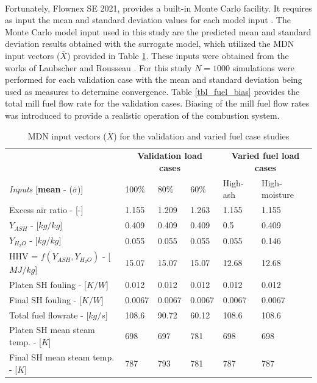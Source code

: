\documentclass[a4paper,fleqn]{cas-sc}
\begin{document}
Fortunately, Flownex SE\textsuperscript{\textregistered} 2021, provides a built-in Monte Carlo facility. It requires as input the mean and standard deviation values for each model input \cite{flownex}. The Monte Carlo model input used in this study are the predicted mean and standard deviation results obtained with the surrogate model, which utilized the MDN input vectors ($\overline{X}$) provided in Table \ref{tbl_inputs}. These inputs were obtained from the works of Laubscher and Rousseau \cite{Laubscher2019b}. For this study $N=1000$ simulations were performed for each validation case with the mean and standard deviation being used as measures to determine convergence. Table \ref{tbl_fuel_bias} provides the total mill fuel flow rate for the validation cases. Biasing of the mill fuel flow rates was introduced to provide a realistic operation of the combustion system.\\

\begin{table}[h!]
\caption{MDN input vectors ($\overline{X}$) for the validation and varied fuel case studies}\label{tbl_inputs}
\begin{tabular*}{\tblwidth}{lp{}p{}p{}p{}p{}}
\toprule
 & \multicolumn{3}{c}{\textbf{Validation load cases}}&\multicolumn{2}{c}{\textbf{Varied fuel load cases}}\\
\textit{Inputs} [\textbf{mean} - ($\overline{\sigma}$)]& 100\%  & 80\% & 60\% & High-ash & High-moisture  \\
\midrule
Excess air ratio - [-] & 1.155 & 1.209 & 1.263 & 1.155 & 1.155  \\
$Y_{ASH}$ - [$kg/kg$] & 0.409 & 0.409 &  0.409 &0.5 & 0.409 \\
$Y_{H_{2}O}$ - [$kg/kg$] & 0.055 & 0.055 & 0.055 & 0.055 & 0.146  \\
HHV = $f(Y_{ASH},Y_{H_{2}O})$ - [$MJ/kg$] & 15.07 & 15.07 & 15.07 & 12.68 & 12.68  \\
Platen SH fouling - [$K/W$]& 0.012 & 0.012 & 0.012 & 0.012 & 0.012  \\
Final SH fouling - [$K/W$] & 0.0067&0.0067 &0.0067 & 0.0067&0.0067  \\
Total fuel flowrate - [$kg/s$] &108.6 & 90.72 & 60.12 &108.6 & 108.6 \\
Platen SH mean steam temp. - [$K$] & 698 &697&781 &698 &698  \\
Final SH mean steam temp. - [$K$]& 787 & 793 &781 &787 &787  \\
\bottomrule
\end{tabular*}
\end{table}  
\end{document}
